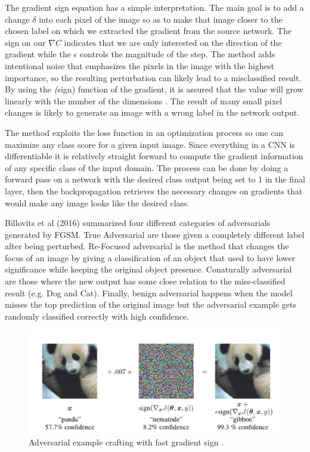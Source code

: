 The gradient sign equation has a simple interpretation. The main goal is to add a change $\delta$ into each pixel of the image so as to make that image closer to the chosen label on which we extracted the gradient from the source network. The sign on our $\nabla C$ indicates that we are only interested on the direction of the gradient while the $\epsilon$ controls the magnitude of the step. The method adds intentional noise that emphasizes the pixels in the image with the highest importance, so the resulting perturbation can likely lead to a misclassified result. By using the \textit(sign) function of the gradient, it is assured that the value will grow linearly with the number of the dimensions \cite{goodfellow2014}. The result of many small pixel changes is likely to generate an image with a wrong label in the network output.

The method exploits the loss function in an optimization process so one can maximize any class score for a given input image. Since everything in a CNN is differentiable it is relatively straight forward to compute the gradient information of any specific class of the input domain. The process can be done by doing a forward pass on a network with the desired class output being set to 1 in the final layer, then the backpropagation retrieves the necessary changes on gradients that would make any image looks like the desired class. 

Billovits et al (2016) summarized four different categories of adversarials generated by FGSM. True Adversarial are those given a completely different label after being perturbed. Re-Focused adversarial is the method that changes the focus of an image by giving a classification of an object that used to have lower significance while keeping the original object presence. Conaturally adversarial are those where the new output has some close relation to the miss-classified result (e.g. Dog and Cat). Finally, benign adversarial happens when the model misses the top prediction of the original image but the adversarial example gets randomly classified correctly with high confidence.

\begin{figure}[!h]
	\centering
	\includegraphics[scale=0.6]{panda.png}
	\caption{Adversarial example crafting with fast gradient sign \cite{goodfellow2014}.}
	\label{fig:fgsm_craft}
\end{figure}

